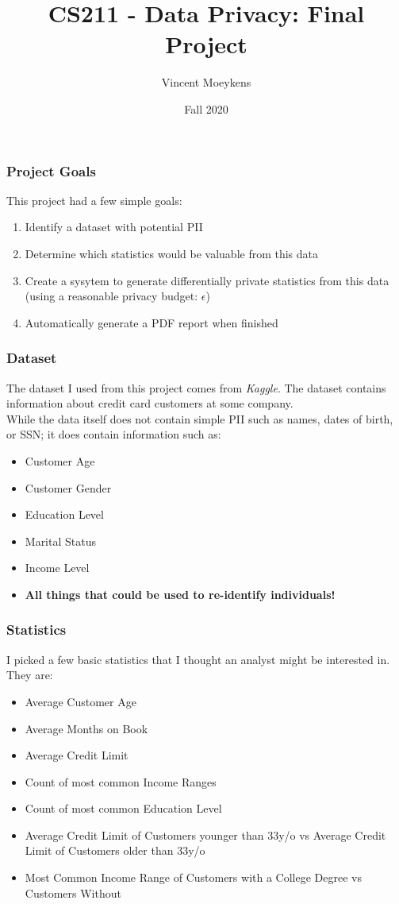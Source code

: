 \documentclass{beamer}
\title{CS211 - Data Privacy: Final Project}
\author{Vincent Moeykens}
\institute{The University of Vermont}
\date{Fall 2020}
\begin{document}
\frame{\titlepage}

\begin{frame}
\frametitle{Project Goals}
This project had a few simple goals:
\begin{enumerate}
\item Identify a dataset with potential PII
\item Determine which statistics would be valuable from this data
\item Create a sysytem to generate differentially private statistics from this data (using a reasonable privacy budget: $\epsilon$)
\item Automatically generate a PDF report when finished
\end{enumerate}
\end{frame}

\begin{frame}
\frametitle{Dataset}
The dataset I used from this project comes from \textit{Kaggle}. The dataset contains information about credit card customers at some company. \\

While the data itself does not contain simple PII such as names, dates of birth, or SSN; it does contain information such as:
\begin{itemize}
 \item<1-> Customer Age
 \item<2-> Customer Gender
 \item<3-> Education Level
 \item<4-> Marital Status
 \item<5-> Income Level
 \item<6-> \textbf{All things that could be used to re-identify individuals!}
\end{itemize}
\end{frame}

\begin{frame}
\frametitle{Statistics}
I picked a few basic statistics that I thought an analyst might be interested in. They are: 
\begin{itemize}
\item Average Customer Age
\item Average Months on Book
\item Average Credit Limit
\item Count of most common Income Ranges
\item Count of most common Education Level
\item Average Credit Limit of Customers younger than 33y/o vs Average Credit Limit of Customers older than 33y/o
\item Most Common Income Range of Customers with a College Degree vs Customers Without
\end{itemize}
\end{frame}
\end{document}
